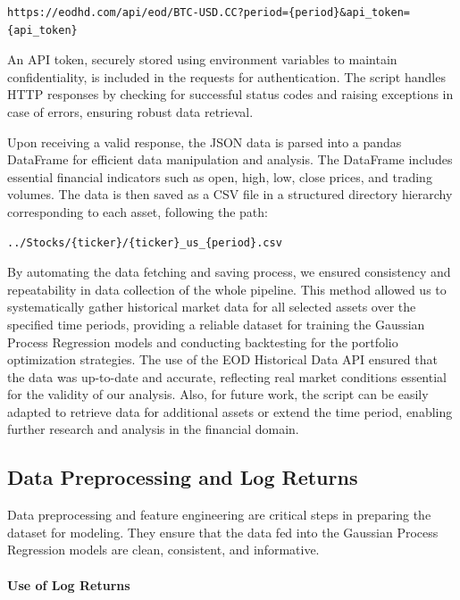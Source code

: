 \begin{verbatim}
https://eodhd.com/api/eod/BTC-USD.CC?period={period}&api_token={api_token}
\end{verbatim}

An API token, securely stored using environment variables to maintain confidentiality, is included in the requests for authentication. The script handles HTTP responses by checking for successful status codes and raising exceptions in case of errors, ensuring robust data retrieval.

Upon receiving a valid response, the JSON data is parsed into a pandas DataFrame for efficient data manipulation and analysis. The DataFrame includes essential financial indicators such as open, high, low, close prices, and trading volumes. The data is then saved as a CSV file in a structured directory hierarchy corresponding to each asset, following the path:

\begin{verbatim}
../Stocks/{ticker}/{ticker}_us_{period}.csv
\end{verbatim}

By automating the data fetching and saving process, we ensured consistency and repeatability in data collection of the whole pipeline. 
This method allowed us to systematically gather historical market data for all selected assets over the specified time periods, providing a reliable dataset for training the Gaussian Process Regression models and conducting backtesting for the portfolio optimization strategies. 
The use of the EOD Historical Data API ensured that the data was up-to-date and accurate, reflecting real market conditions essential for the validity of our analysis.
Also, for future work, the script can be easily adapted to retrieve data for additional assets or extend the time period, enabling further research and analysis in the financial domain.

\subsection{Data Preprocessing and Log Returns}
Data preprocessing and feature engineering are critical steps in preparing the dataset for modeling. They ensure that the data fed into the Gaussian Process Regression models are clean, consistent, and informative.

\paragraph{Use of Log Returns}

